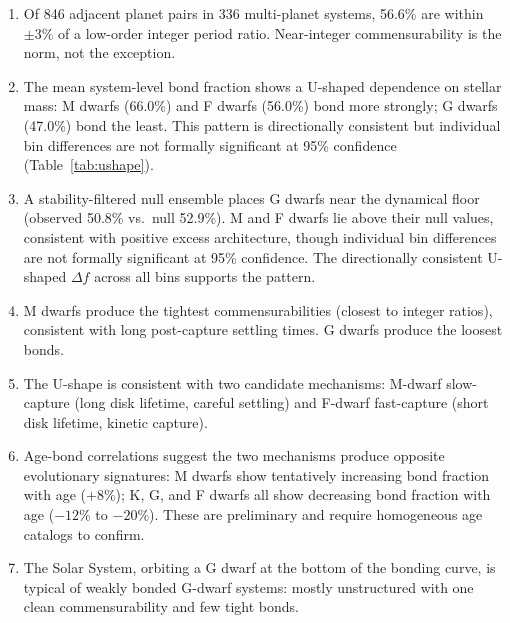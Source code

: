\documentclass[twocolumn]{aastex631}
\begin{document}
\begin{enumerate}
  \item Of 846 adjacent planet pairs in 336 multi-planet systems, 56.6\% are
        within $\pm 3\%$ of a low-order integer period ratio. Near-integer
        commensurability is the norm, not the exception.
  \item The mean system-level bond fraction shows a U-shaped dependence on
        stellar mass: M dwarfs (66.0\%) and F dwarfs (56.0\%) bond more
        strongly; G dwarfs (47.0\%) bond the least. This pattern is
        directionally consistent but individual bin differences are not
        formally significant at 95\% confidence (Table~\ref{tab:ushape}).
  \item A stability-filtered null ensemble places G dwarfs near the dynamical
        floor (observed 50.8\% vs.\ null 52.9\%). M and F dwarfs lie above
        their null values, consistent with positive excess architecture,
        though individual bin differences are not formally significant at 95\%
        confidence. The directionally consistent U-shaped $\Delta f$ across all
        bins supports the pattern.
  \item M dwarfs produce the tightest commensurabilities (closest to integer
        ratios), consistent with long post-capture settling times. G dwarfs
        produce the loosest bonds.
  \item The U-shape is consistent with two candidate mechanisms: M-dwarf
        slow-capture (long disk lifetime, careful settling) and F-dwarf
        fast-capture (short disk lifetime, kinetic capture).
  \item Age-bond correlations suggest the two mechanisms produce opposite
        evolutionary signatures: M dwarfs show tentatively increasing bond
        fraction with age ($+8\%$); K, G, and F dwarfs all show decreasing
        bond fraction with age ($-12\%$ to $-20\%$). These are preliminary and
        require homogeneous age catalogs to confirm.
  \item The Solar System, orbiting a G dwarf at the bottom of the bonding
        curve, is typical of weakly bonded G-dwarf systems: mostly unstructured
        with one clean commensurability and few tight bonds.
\end{enumerate}
\end{document}
